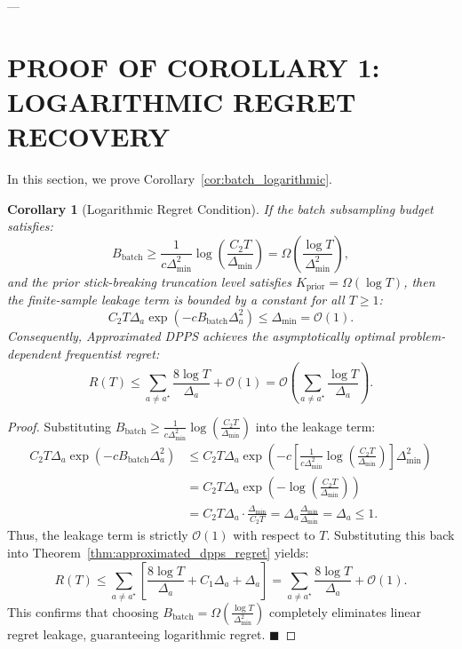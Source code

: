 \documentclass[twoside]{article}
\newtheorem{corollary}[theorem]{Corollary}
\begin{document}
---

\section{PROOF OF COROLLARY 1: LOGARITHMIC REGRET RECOVERY}
\label{app:proof_cor1}

In this section, we prove Corollary~\ref{cor:batch_logarithmic}.

\begin{corollary}[Logarithmic Regret Condition]
If the batch subsampling budget satisfies:
\begin{equation}
B_{\text{batch}} \ge \frac{1}{c \Delta_{\min}^2} \log\left( \frac{C_2 T}{\Delta_{\min}} \right) = \Omega\left( \frac{\log T}{\Delta_{\min}^2} \right),
\end{equation}
and the prior stick-breaking truncation level satisfies $K_{\text{prior}} = \Omega(\log T)$, then the finite-sample leakage term is bounded by a constant for all $T \ge 1$:
\begin{equation}
C_2 T \Delta_a \exp\left( - c B_{\text{batch}} \Delta_a^2 \right) \le \Delta_{\min} = \mathcal{O}(1).
\end{equation}
Consequently, Approximated DPPS achieves the asymptotically optimal problem-dependent frequentist regret:
\begin{equation}
R(T) \le \sum_{a \ne a^\star} \frac{8 \log T}{\Delta_a} + \mathcal{O}(1) = \mathcal{O}\left( \sum_{a \ne a^\star} \frac{\log T}{\Delta_a} \right).
\end{equation}
\end{corollary}

\begin{proof}
Substituting $B_{\text{batch}} \ge \frac{1}{c \Delta_{\min}^2} \log\left( \frac{C_2 T}{\Delta_{\min}} \right)$ into the leakage term:
\begin{align}
C_2 T \Delta_a \exp\left( - c B_{\text{batch}} \Delta_a^2 \right) &\le C_2 T \Delta_a \exp\left( - c \left[ \frac{1}{c \Delta_{\min}^2} \log\left( \frac{C_2 T}{\Delta_{\min}} \right) \right] \Delta_{\min}^2 \right) \nonumber \\
&= C_2 T \Delta_a \exp\left( - \log\left( \frac{C_2 T}{\Delta_{\min}} \right) \right) \nonumber \\
&= C_2 T \Delta_a \cdot \frac{\Delta_{\min}}{C_2 T} = \Delta_a \frac{\Delta_{\min}}{\Delta_{\min}} = \Delta_a \le 1.
\end{align}
Thus, the leakage term is strictly $\mathcal{O}(1)$ with respect to $T$. Substituting this back into Theorem~\ref{thm:approximated_dpps_regret} yields:
\begin{equation}
R(T) \le \sum_{a \ne a^\star} \left[ \frac{8 \log T}{\Delta_a} + C_1 \Delta_a + \Delta_a \right] = \sum_{a \ne a^\star} \frac{8 \log T}{\Delta_a} + \mathcal{O}(1).
\end{equation}
This confirms that choosing $B_{\text{batch}} = \Omega\left(\frac{\log T}{\Delta_{\min}^2}\right)$ completely eliminates linear regret leakage, guaranteeing logarithmic regret. \hfill $\blacksquare$
\end{proof}
\end{document}
